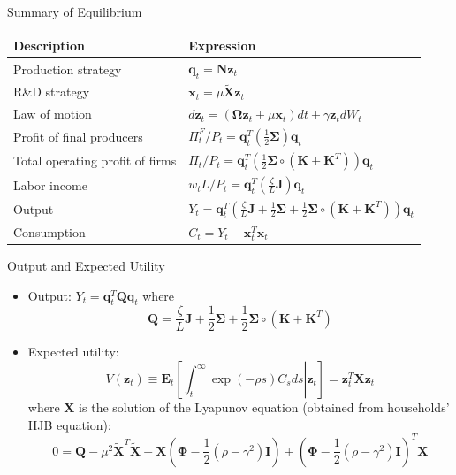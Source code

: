 \documentclass[
  10pt,
  aspectratio=169,   %
]{beamer}
\theoremstyle{plain}
\begin{document}
\begin{frame}{Summary of Equilibrium}
  \label{summary}
  \begin{center}
    \begin{tabular}{ll}
      Description                     & Expression\tabularnewline
      \hline
      Production strategy             & $\bm{q}_{t}=\bm{N}\bm{z}_{t}$\tabularnewline
      R\&D strategy                   & $\bm{x}_{t}=\mu\tilde{\bm{X}}\bm{z}_{t}$\tabularnewline
      Law of motion                   & $d\bm{z}_{t}=\left(\bm{\Omega}\bm{z}_{t}+\mu\bm{x}_{t}\right)dt+\gamma\bm{z}_{t}dW_{t}$\tabularnewline
      Profit of final producers       & $\Pi_{t}^{F}/P_{t}=\bm{q}_{t}^{T}\left(\frac{1}{2}\bm{\Sigma}\right)\bm{q}_{t}$\tabularnewline
      Total operating profit of firms & $\Pi_{t}/P_{t}=\bm{q}_{t}^{T}\left(\frac{1}{2}\bm{\Sigma}\circ\left(\bm{K}+\bm{K}^{T}\right)\right)\bm{q}_{t}$\tabularnewline
      Labor income                    & $w_{t}L/P_{t}=\bm{q}_{t}^{T}\left(\frac{\zeta}{L}\bm{J}\right)\bm{q}_{t}$\tabularnewline
      Output                          & $Y_{t}=\bm{q}_{t}^{T}\left(\frac{\zeta}{L}\bm{J}+\frac{1}{2}\bm{\Sigma}+\frac{1}{2}\bm{\Sigma}\circ\left(\bm{K}+\bm{K}^{T}\right)\right)\bm{q}_{t}$\tabularnewline
      Consumption                     & $C_{t}=Y_{t}-\bm{x}_{t}^{T}\bm{x}_{t}$\tabularnewline
    \end{tabular}
  \end{center}
  \hyperlink{aggregation}{}
\end{frame}

\begin{frame}{Output and Expected Utility}
  \label{X}
  \begin{itemize}
    \item Output: $Y_{t}=\bm{q}_{t}^{T}\bm{Q}\bm{q}_{t}$ where
          \[
            \bm{Q}=\frac{\zeta}{L}\bm{J}+\frac{1}{2}\bm{\Sigma}+\frac{1}{2}\bm{\Sigma}\circ\left(\bm{K}+\bm{K}^{T}\right)
          \]
    \item Expected utility:
          \[
            V\left(\bm{z}_{t}\right)\equiv\bm{E}_{t}\left[\left.\int_{t}^{\infty}\exp\left(-\rho s\right)C_{s}ds\right|\bm{z}_{t}\right]=\bm{z}_{t}^{T}\bm{X}\bm{z}_{t}
          \]
          where $\bm{X}$ is the solution of the Lyapunov equation (obtained from households' HJB equation):
          \[
            0=\bm{Q}-\mu^{2}\tilde{\bm{X}}^{T}\tilde{\bm{X}}+\bm{X}\left(\bm{\Phi}-\frac{1}{2}\left(\rho-\gamma^{2}\right)\bm{I}\right)+\left(\bm{\Phi}-\frac{1}{2}\left(\rho-\gamma^{2}\right)\bm{I}\right)^{T}\bm{X}
          \]
  \end{itemize}
  \hyperlink{aggregation}{}
\end{frame}
\end{document}
